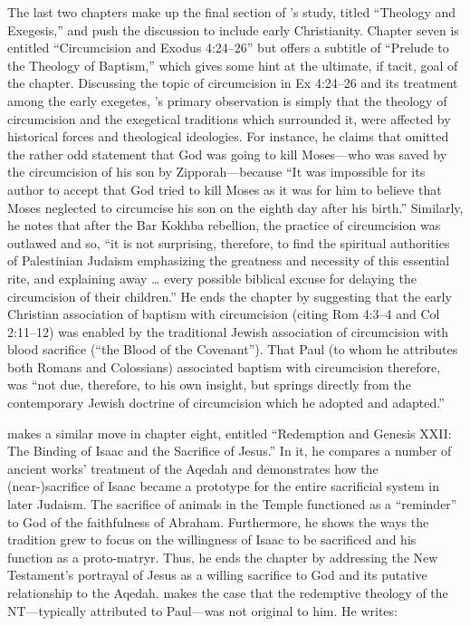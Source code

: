 The last two chapters make up the final section of
\vermes's study, titled ``Theology and Exegesis,'' and
push the discussion to include early Christianity. Chapter seven is
entitled ``Circumcision and Exodus 4:24--26'' but offers a subtitle of
``Prelude to the Theology of Baptism,'' which gives some hint at the
ultimate, if tacit, goal of the chapter. Discussing the topic of
circumcision in Ex 4:24--26 and its treatment among the early exegetes,
\vermes's primary observation is simply that the
theology of circumcision and the exegetical traditions which surrounded
it, were affected by historical forces and theological ideologies. For
instance, he claims that \jub omitted the rather odd
statement that God was going to kill Moses---who was saved by the
circumcision of his son by Zipporah---because ``It was impossible for
its author to accept that God tried to kill Moses as it was for him to
believe that Moses neglected to circumcise his son on the eighth day
after his birth.''\autocite[185]{vermes1961} Similarly, he notes that
after the Bar Kokhba rebellion, the practice of circumcision was
outlawed and so, ``it is not surprising, therefore, to find the
spiritual authorities of Palestinian Judaism emphasizing the greatness
and necessity of this essential rite, and explaining away \ldots{} every
possible biblical excuse for delaying the circumcision of their
children.''\autocite[189]{vermes1961} He ends the chapter by suggesting
that the early Christian association of baptism with circumcision
(citing Rom 4:3--4 and Col 2:11--12) was enabled by the traditional
Jewish association of circumcision with blood sacrifice (``the Blood of
the Covenant'')\autocite[190]{vermes1961}. That Paul (to whom he
attributes both Romans and Colossians) associated baptism with
circumcision therefore, was ``not due, therefore, to his own insight,
but springs directly from the contemporary Jewish doctrine of
circumcision which he adopted and adapted.''\autocite[191]{vermes1961}

\vermes makes a similar move in chapter eight, entitled
``Redemption and Genesis XXII: The Binding of Isaac and the Sacrifice of
Jesus.'' In it, he compares a number of ancient works' treatment of the
Aqedah and demonstrates how the (near-)sacrifice of Isaac became a
prototype for the entire sacrificial system in later Judaism. The
sacrifice of animals in the Temple functioned as a ``reminder'' to God
of the faithfulness of Abraham. Furthermore, he shows the ways the
tradition grew to focus on the willingness of Isaac to be sacrificed and
his function as a proto-matryr. Thus, he ends the chapter by addressing
the New Testament's portrayal of Jesus as a willing sacrifice to God and
its putative relationship to the Aqedah. \vermes makes
the case that the redemptive theology of the NT---typically attributed
to Paul---was not original to him. He writes:

